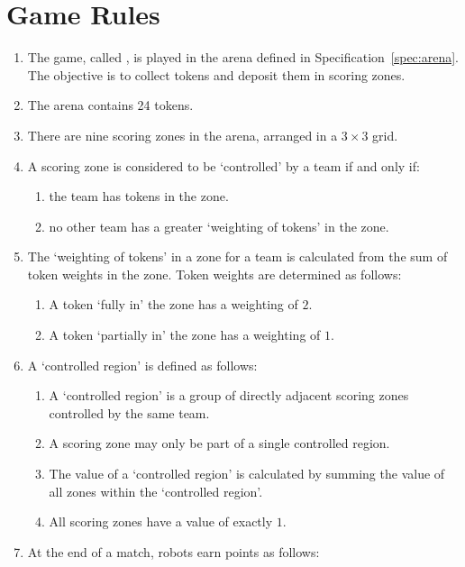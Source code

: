 \section{Game Rules}
\label{sec:rules}

\begin{enumerate}
  \item The game, called \emph{\gamename}, is played in the arena defined in
        Specification~\ref{spec:arena}. The objective is to collect tokens and
        deposit them in scoring zones.
  \item The arena contains 24 tokens.
  \item There are nine scoring zones in the arena, arranged in a $3\times3$
        grid.
  \item A scoring zone is considered to be `controlled' by a team if and only if:
    \begin{enumerate}
      \item the team has tokens in the zone.
      \item no other team has a greater `weighting of tokens' in the zone.
    \end{enumerate}
  \item The `weighting of tokens' in a zone for a team is calculated from the sum of token weights in the zone.
      Token weights are determined as follows:
      \begin{enumerate}
            \item A token `fully in' the zone has a weighting of $2$.
            \item A token `partially in' the zone has a weighting of $1$.
    \end{enumerate}
  \item A `controlled region' is defined as follows:
    \begin{enumerate}
      \item A `controlled region' is a group of directly adjacent scoring zones controlled by the same team.
      \item A scoring zone may only be part of a single controlled region.
      \item The value of a `controlled region' is calculated by summing the value of all zones within the `controlled region'.
      \item All scoring zones have a value of exactly $1$.
    \end{enumerate}
  \item At the end of a match, robots earn points as follows:
    \begin{enumerate}

\end{enumerate}
\end{enumerate}
